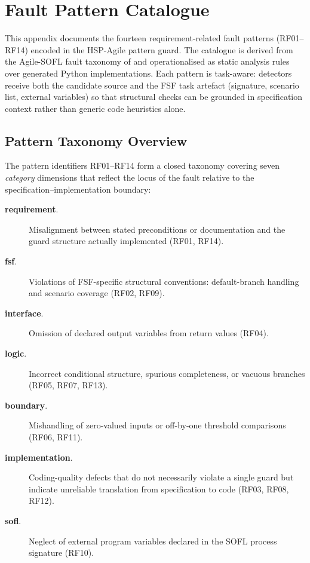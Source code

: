\chapter{Fault Pattern Catalogue}
\label{app:patterns}

This appendix documents the fourteen requirement-related fault patterns (RF01--RF14)
encoded in the HSP-Agile pattern guard.  The catalogue is derived from the
Agile-SOFL fault taxonomy of \citet{li2023iet} and operationalised as
static analysis rules over generated Python implementations.  Each pattern is
task-aware: detectors receive both the candidate source and the FSF task
artefact (signature, scenario list, external variables) so that structural
checks can be grounded in specification context rather than generic code
heuristics alone.

\section{Pattern Taxonomy Overview}
\label{sec:pat:taxonomy}

The pattern identifiers RF01--RF14 form a closed taxonomy covering seven
\emph{category} dimensions that reflect the locus of the fault relative to
the specification--implementation boundary:

\begin{description}
  \item[\textbf{requirement}.]
        Misalignment between stated preconditions or documentation and the
        guard structure actually implemented (RF01, RF14).
  \item[\textbf{fsf}.]
        Violations of FSF-specific structural conventions: default-branch
        handling and scenario coverage (RF02, RF09).
  \item[\textbf{interface}.]
        Omission of declared output variables from return values (RF04).
  \item[\textbf{logic}.]
        Incorrect conditional structure, spurious completeness, or vacuous
        branches (RF05, RF07, RF13).
  \item[\textbf{boundary}.]
        Mishandling of zero-valued inputs or off-by-one threshold comparisons
        (RF06, RF11).
  \item[\textbf{implementation}.]
        Coding-quality defects that do not necessarily violate a single guard
        but indicate unreliable translation from specification to code
        (RF03, RF08, RF12).
  \item[\textbf{sofl}.]
        Neglect of external program variables declared in the SOFL process
        signature (RF10).
\end{description}

